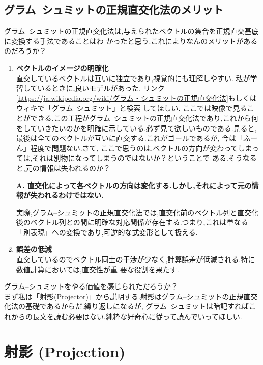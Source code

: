 \subsection{グラム--シュミットの正規直交化法のメリット}
グラム--シュミットの正規直交化法は,与えられたベクトルの集合を正規直交基底に変換する手法であることはわ
かったと思う.これによりなんのメリットがあるのだろうか？
\begin{enumerate}
    \item \textbf{ベクトルのイメージの明確化}\\
    直交しているベクトルは互いに独立であり,視覚的にも理解しやすい.
    私が学習しているときに,良いモデルがあった.
    \hypertarget{wiki}{}
    リンク[\url{https://ja.wikipedia.org/wiki/グラム・シュミットの正規直交化法}]もしくはウィキで「グラム--シュミット」と検索
    してほしい. ここでは映像で見ることができる.この工程がグラム--シュミットの正規直交化法であり,これから何
    をしていきたいのかを明確に示している.必ず見て欲しいものである.見ると,最後は全てのベクトルが互いに直交する.これがゴールであるが,
    今は「ふーん」程度で問題ない.さて,
    ここで思うのは,ベクトルの方向が変わってしまっては,それは別物になってしまうのではないか？ということで
    ある.そうなると,元の情報は失われるのか？
    \begin{center}
        \textbf{A. 直交化によって各ベクトルの方向は変化する.しかし,それによって元の情報が失われるわけではない.}
    \end{center}
 実際,\hyperlink{Gram}{グラム–シュミットの正規直交化法}では,直交化前のベクトル列と直交化後のベクトル列との間に明確な対応関係が存在する.つまり,これは単なる「別表現」への変換であり,可逆的な式変形として扱える.
    \item \textbf{誤差の低減}\\
    直交しているのでベクトル同士の干渉が少なく,計算誤差が低減される.特に数値計算においては,直交性が重
    要な役割を果たす.
\end{enumerate}
\vspace{1cm}
\hspace{1em}
グラム--シュミットをやる価値を感じられただろうか？\\
まず私は「射影(Projector)」から説明する.射影はグラム--シュミットの正規直交化法の基礎であるからだ.繰り返しになるが,
グラム--シュミットは暗記すればこれからの長文を読む必要はない.純粋な好奇心に従って読んでいってほしい.
\section{射影 (Projection)}\label{sec:projection}

